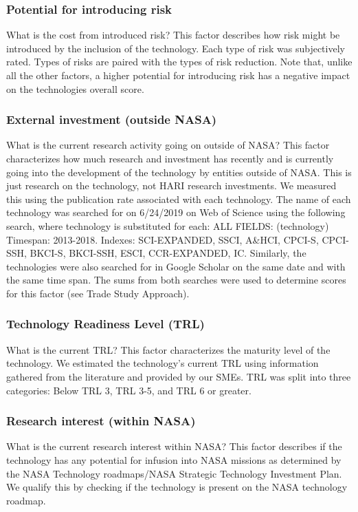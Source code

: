 \subsubsection{Potential for introducing risk}
What is the cost from introduced risk? This factor describes how risk might be introduced by the inclusion of the technology.
Each type of risk was subjectively rated.
Types of risks are paired with the types of risk reduction.
Note that, unlike all the other factors, a higher potential for introducing risk has a negative impact on the technologies overall score.

\subsubsection{External investment (outside NASA)}
What is the current research activity going on outside of NASA? This factor characterizes how much research and investment has recently and is currently going into the development of the technology by entities outside of NASA.
This is just research on the technology, not HARI research investments.
We measured this using the publication rate associated with each technology.
The name of each technology was searched for on 6/24/2019 on Web of Science using the following search, where technology is substituted for each:
ALL FIELDS: (technology)
Timespan: 2013-2018.
Indexes: SCI-EXPANDED, SSCI, A\&HCI, CPCI-S, CPCI-SSH, BKCI-S, BKCI-SSH, ESCI, CCR-EXPANDED, IC.
Similarly, the technologies were also searched for in Google Scholar on the same date and with the same time span.
The sums from both searches were used to determine scores for this factor (see Trade Study Approach).

\subsubsection{Technology Readiness Level (TRL)}
What is the current TRL? This factor characterizes the maturity level of the technology.
We estimated the technology's current TRL using information gathered from the literature and provided by our SMEs.
TRL was split into three categories: Below TRL 3, TRL 3-5, and TRL 6 or greater.

\subsubsection{Research interest (within NASA)}
What is the current research interest within NASA? This factor describes if the technology has any potential for infusion into NASA missions as determined by the NASA Technology roadmaps/NASA Strategic Technology Investment Plan.
We qualify this by checking if the technology is present on the NASA technology roadmap.

